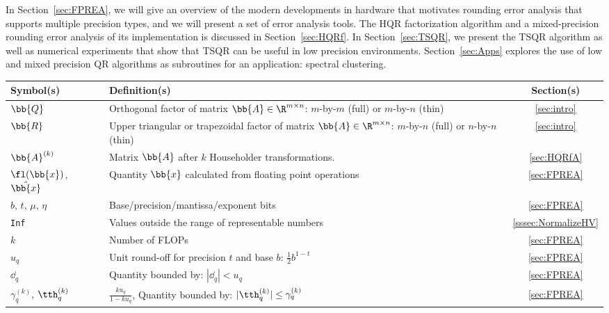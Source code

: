In Section~\ref{sec:FPREA}, we will give an overview of the modern developments in hardware that motivates rounding error analysis that supports multiple precision types, and we will present a set of error analysis tools. 
The HQR factorization algorithm and a mixed-precision rounding error analysis of its implementation is discussed in Section~\ref{sec:HQRf}.
In Section~\ref{sec:TSQR}, we present the TSQR algorithm as well as numerical experiments that show that TSQR can be useful in low precision environments. Section~\ref{sec:Apps} explores the use of low and mixed precision QR algorithms as subroutines for an application: spectral clustering. 
\begin{table}[h!]
	\centering
	\begin{tabular}{|m{3cm}|m{9cm}|c|}
		\hline
		Symbol(s) & Definition(s) & Section(s) \\
		\hline
		$\bb{Q}$  & Orthogonal factor of matrix $\bb{A}\in\R^{m\times n}$: $m$-by-$m$ (full) or $m$-by-$n$ (thin)  & \ref{sec:intro}\\
		$\bb{R}$ & Upper triangular or trapezoidal factor of matrix $\bb{A}\in\R^{m\times n}$:  $m$-by-$n$ (full) or $n$-by-$n$ (thin)  &  \ref{sec:intro}\\ 
		$\bb{A}^{(k)}$ & Matrix $\bb{A}$ after $k$ Householder transformations. &\ref{sec:HQRfA}\\
		\hline
		$\fl(\bb{x})$, $\hat{\bb{x}}$ & Quantity $\bb{x}$ calculated from floating point operations & \ref{sec:FPREA} \\
		$b$, $t$, $\mu$, $\eta$  & Base/precision/mantissa/exponent bits & \ref{sec:FPREA} \\
		\tt{Inf} & Values outside the range of representable numbers & \ref{sssec:NormalizeHV} \\ %
		$k$ & Number of FLOPs &  \ref{sec:FPREA}\\
		$u_q$ & Unit round-off for precision $t$ and base $b$: $\frac{1}{2}b^{1-t}$ & \ref{sec:FPREA} \\  
		$\dd_{q}$ &Quantity bounded by: $|\dd_{q}| < u_q$ &  \ref{sec:FPREA} \\
		$\gamma_{q}^{(k)}$,  $\tth_{q}^{(k)}$& $\frac{ku_q}{1-ku_q}$, Quantity bounded by: $|\tth_{q}^{(k)}|\leq\gamma_q^{(k)}$ &  \ref{sec:FPREA} \\

\end{tabular}
\end{table}
